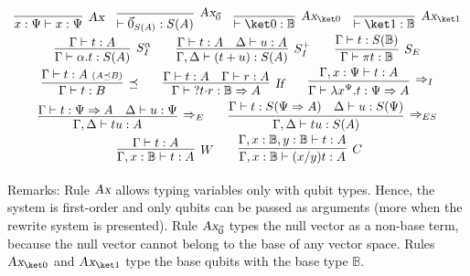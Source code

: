 \documentclass[preprint]{elsarticle}
\newcommand\B{\ensuremath{\mathbb B}}
\newcommand\gB{\ensuremath{\Psi}}
\newcommand\ite[3]{{#1}?{#2}\mathord{\cdot}{#3}}
\newcommand\pair[2]{({#1}+{#2})}
\newcommand\z[1][A]{\vec 0_{S(#1)}}
\newcommand\tax{\textsl{Ax}}
\newcommand\tif{\textsl{If}}
\begin{document}
\begin{table}
  \[\def\arraystretch{1.5}
    \begin{array}{c}
      \infer[\tax]
      {x:\gB\vdash x:\gB}
      {}
      \quad
      \infer[\tax_{\vec 0}]
      {\vdash \z:S(A)}
      {}
      \quad
      \infer[\tax_{\ket 0}]
      {\vdash\ket 0:\B}
      {}
      \quad
      \infer[\tax_{\ket 1}]
      {\vdash\ket 1:\B}
      {}
      \\
      \infer[S_I^\alpha]
      {\Gamma\vdash \alpha.t:S(A)}
      {\Gamma\vdash t:A}
      \qquad
      \infer[S_I^+]
      {\Gamma,\Delta\vdash\pair tu:S(A)}
      {
      \Gamma\vdash t:A
      &
        \Delta\vdash u:A
        }
        \qquad
        \infer[S_E]
        {\Gamma\vdash\pi t:\B}
        {\Gamma\vdash t:S(\B)}
      \\
      \infer[\preceq]
      {\Gamma\vdash t:B}
      {
      \Gamma\vdash t:A
      \
      {\scriptstyle (A\preceq B)}
      }
      \qquad
      \infer[\tif]
      {\Gamma\vdash\ite{}tr:\B\Rightarrow A}{\Gamma\vdash t:A & \Gamma\vdash r:A}
                                                                \qquad
                                                                \infer[\Rightarrow_I]
                                                                {\Gamma\vdash\lambda x^{\gB}.t:\gB\Rightarrow A}
                                                                {\Gamma,x:\gB\vdash t:A}
      \\
      \infer[\Rightarrow_E]
      {\Gamma,\Delta\vdash tu:A}
      {
      \Gamma\vdash t:\gB\Rightarrow A
      &
        \Delta\vdash u:\gB
        }
        \qquad
        \infer[\Rightarrow_{ES}]
        {\Gamma,\Delta\vdash tu:S(A)}
        {
        \Gamma\vdash t:S(\gB\Rightarrow A)
                                                              &
                                                                \Delta\vdash u:S(\gB)
                                                                }
      \\
      \ \qquad
      \infer[W]
      {\Gamma,x:\B\vdash t:A}
      {\Gamma\vdash t:A}
      \qquad
      \infer[C]
      {\Gamma,x:\B\vdash (x/y)t:A}
      {\Gamma,x:\B,y:\B\vdash t:A}
      \qquad
    \end{array}
  \]
  \caption{First type system, without product.}
  \label{tab:TS}
\end{table}

Remarks: Rule $\tax$ allows typing variables only with qubit types. Hence, the
system is first-order and only qubits can be passed as arguments (more when the
rewrite system is presented). Rule $\tax_{\vec 0}$ types the null vector as a
non-base term, because the null vector cannot belong to the base of any vector
space. Rules $\tax_{\ket 0}$ and $\tax_{\ket 1}$ type the base qubits with the
base type $\B$.
\end{document}
